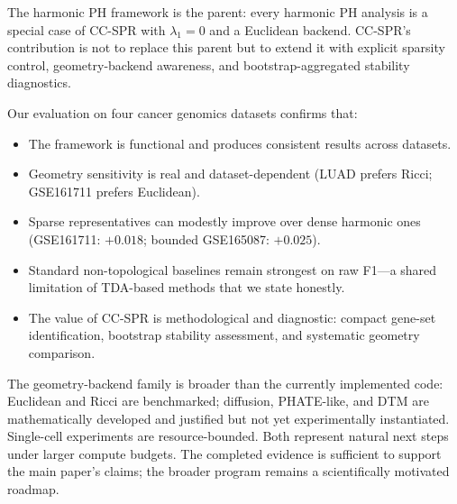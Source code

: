 \documentclass[11pt]{article}
\begin{document}
The harmonic PH framework is the parent: every harmonic PH analysis is a special case of CC-SPR with $\lambda_1 = 0$ and a Euclidean backend.
CC-SPR's contribution is not to replace this parent but to extend it with explicit sparsity control, geometry-backend awareness, and bootstrap-aggregated stability diagnostics.

Our evaluation on four cancer genomics datasets confirms that:
\begin{itemize}[leftmargin=1.5em]
\item The framework is functional and produces consistent results across datasets.
\item Geometry sensitivity is real and dataset-dependent (LUAD prefers Ricci; GSE161711 prefers Euclidean).
\item Sparse representatives can modestly improve over dense harmonic ones (GSE161711: $+0.018$; bounded GSE165087: $+0.025$).
\item Standard non-topological baselines remain strongest on raw F1---a shared limitation of TDA-based methods that we state honestly.
\item The value of CC-SPR is methodological and diagnostic: compact gene-set identification, bootstrap stability assessment, and systematic geometry comparison.
\end{itemize}

The geometry-backend family is broader than the currently implemented code: Euclidean and Ricci are benchmarked; diffusion, PHATE-like, and DTM are mathematically developed and justified but not yet experimentally instantiated.
Single-cell experiments are resource-bounded.
Both represent natural next steps under larger compute budgets.
The completed evidence is sufficient to support the main paper's claims; the broader program remains a scientifically motivated roadmap.
\end{document}
